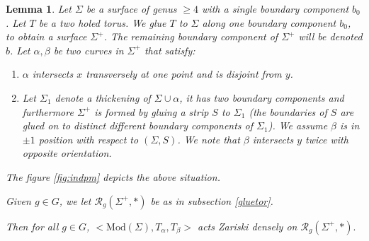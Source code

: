 \documentclass{article}
\newcommand{\Rc}{\mathcal{R}}
\newcommand{\Mod}{\textrm{Mod}}
\newtheorem{lemma}{Lemma}[theorem]
\begin{document}
\begin{lemma}\label{indpm}
Let $\Sigma$ be a surface of genus $\ge 4$ with a single boundary component $b_0$. Let $T$ be a two holed torus. We glue $T$ to $\Sigma$ along  one boundary component $b_0$, to obtain a surface $\Sigma^+$. The remaining boundary component of $\Sigma^+$  will be denoted $b$.
Let $\alpha, \beta$ be two curves in $\Sigma^+$ that satisfy:
\begin{enumerate}
    \item $\alpha $ intersects $x$ transversely at one point and is disjoint from $y$.
    \item Let $\Sigma_1$ denote a thickening of $\Sigma \cup \alpha$, it has two boundary components and furthermore $\Sigma^+$ is formed by gluing a strip $S$ to $\Sigma_1$ (the boundaries of $S$ are glued on to distinct different boundary components of $\Sigma_1$). We assume $\beta$ is in $\pm 1$ position with respect to $(\Sigma, S)$. We note that  $\beta$ intersects $y$ twice with opposite orientation.
\end{enumerate}

The figure \ref{fig:indpm} depicts the  above situation.

Given $g \in G$, we let $\Rc_g(\Sigma^+, *)$ be as in subsection \ref{gluetor}.

Then for all $g\in G$, $<\Mod(\Sigma), T_{\alpha}, T_{\beta}>$ acts Zariski densely on $\Rc_g(\Sigma^+, *).$
\end{lemma}
\end{document}

